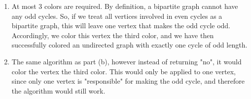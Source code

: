 \documentclass{article}
\begin{document}
\begin{enumerate}
\begin{enumerate}
            \item
            At most 3 colors are required. By definition, a bipartite graph cannot have any odd cycles. So, if we treat all vertices involved in even cycles as a bipartite graph, this will leave one vertex that makes the odd cycle odd. Accordingly, we color this vertex the third color, and we have then successfully colored an undirected graph with exactly one cycle of odd length.
            
            \item
            The same algorithm as part (b), however instead of returning "no", it would color the vertex the third color. This would only be applied to one vertex, since only one vertex is "responsible" for making the odd cycle, and therefore the algorithm would still work.
        \end{enumerate}
\end{enumerate}
\end{document}

